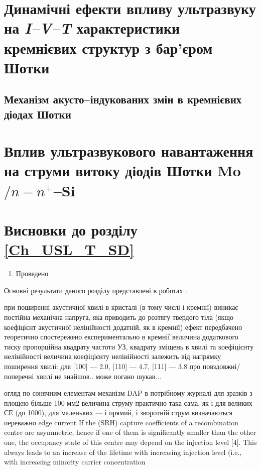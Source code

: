 \documentclass[a4paper,14pt,oneside,openany]{memoir}
\begin{document}
\section{Динамічні ефекти впливу ультразвуку на \emph{I--V--T} характеристики кремнієвих структур з бар'єром Шотки\label{SSDB:Forw}}

\subsection{Механізм акусто--індукованих змін в кремнієвих діодах Шотки}

\section{Вплив ультразвукового навантаження на струми витоку діодів Шотки Mo$/n-n^+$--Si\label{SSDB:Rev}}



\section*{Висновки до розділу \ref{Ch_USL_T_SD}}
  \begin{enumerate}
     \item Проведено
  \end{enumerate}	

Основні результати даного розділу представлені в роботах \cite{Olikh:UPJ2014,OlikhJAP,Olikh:Ultras2016,Olikh2016JSem,
8Drog,2014IUSOl,2015ICU,7UNCPS}.








при поширенні акустичної хвилі в кристалі (в тому числі і кремнії) виникає  постійна механічна напруга,
яка приводить до розтягу твердого тіла (якщо коефіцієнт акустичної нелінійності додатній, як в кремнії)
ефект передбачено теоретично \cite{Thurston,StaticStrain:PhysRevB30I}
спостережено експериментально в кремнії \cite{StaticStrain:PhysRevB30II}
величина додаткового тиску пропорційна квадрату частоти УЗ, квадрату зміщень в хвилі та коефіцієнту нелінійності\cite{StaticStrain:PhysRevB30II}
величина коефіцієнту нелінійності залежить від напрямку поширення хвилі:
для [100] --- 2.0, [110] --- 4.7, [111] --- 3.8 \cite{NelinSi}
про повздовжні/поперечні хвилі не знайшов.. може погано шукав...



огляд по сонячним елементам \cite{Breitenstein2013}
механізм DAP в потрібному журналі \cite{CDLR:SupMicr}
для зразків з площею більше 100 мм2 величина струму практично така сама, як і для великих СЕ (до 1000),
для маленьких --- і прямий, і зворотній струм визначаються переважно edge current \cite{Breitenstein2013,SC:Area}
If the  (SRH) capture coefficients of a recombination centre
are asymmetric, hence if one of them is significantly smaller
than the other one, the occupancy state of this centre may
depend on the injection level [4]. This always leads to an
increase of the lifetime with increasing injection level (i.e.,
with increasing minority carrier concentration \cite{Breitenstein2013,TauOnIph}
\end{document}
